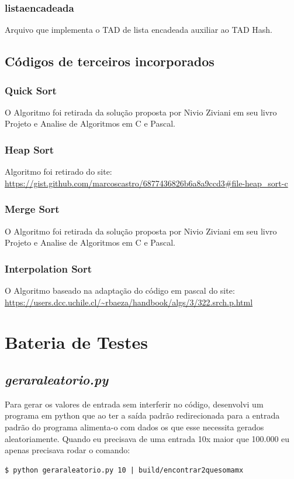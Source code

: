 \documentclass[12pt]{article}
\begin{document}
            \subsubsection{listaencadeada}
                Arquivo que implementa o TAD de lista encadeada auxiliar ao TAD Hash.
        \subsection{Códigos de terceiros incorporados}\label{codigos}
            \subsubsection{Quick Sort}\label{codigos_QuickSort}
                O Algoritmo foi retirada da solução proposta por Nivio Ziviani em seu livro Projeto e Analise de Algoritmos em C e Pascal. 
            \subsubsection{Heap Sort}\label{codigos_HeapSort}
                Algoritmo foi retirado do site: \url{https://gist.github.com/marcoscastro/6877436826b6a8a9ccd3#file-heap_sort-c}
            \subsubsection{Merge Sort}\label{codigos_MergeSort}
                O Algoritmo foi retirada da solução proposta por Nivio Ziviani em seu livro Projeto e Analise de Algoritmos em C e Pascal.
            \subsubsection{Interpolation Sort}\label{codigos_InterpolationSearch}
                O Algoritmo baseado na adaptação do código em pascal do site: \url{https://users.dcc.uchile.cl/~rbaeza/handbook/algs/3/322.srch.p.html}
                
    \section{Bateria de Testes}\label{testes}
        \subsection{\textit{geraraleatorio.py}}\label{gerador}
            Para gerar os valores de entrada sem interferir no código, desenvolvi um programa em python que ao ter a saída padrão redirecionada para a entrada padrão do programa alimenta-o com dados os que esse necessita gerados aleatoriamente. Quando eu precisava de uma entrada 10x maior que 100.000 eu apenas precisava rodar o comando: 
            \begin{verbatim}$ python geraraleatorio.py 10 | build/encontrar2quesomamx\end{verbatim}
            
\end{document}
